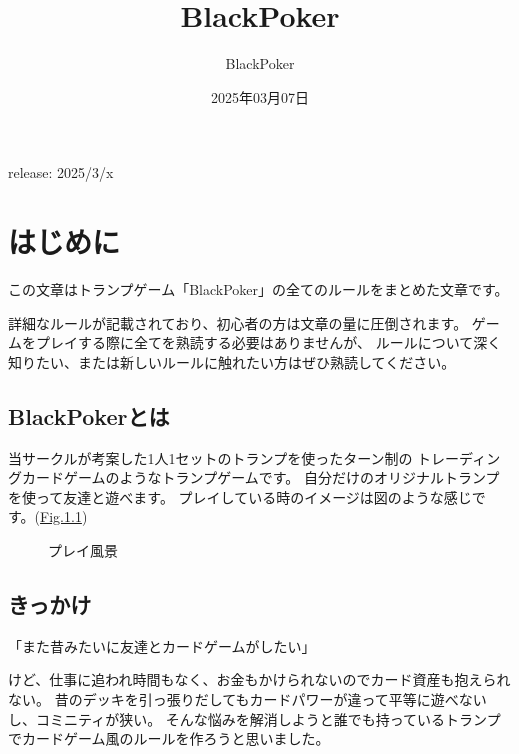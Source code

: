 \documentclass[letterpaper,10pt,dvipdfmx]{sphinxmanual}
\title{BlackPoker}
\date{2025年03月07日}
\author{BlackPoker}
\begin{document}
\pagestyle{empty}
\sphinxmaketitle
\pagestyle{plain}
\sphinxtableofcontents
\pagestyle{normal}
\label{\detokenize{index::doc}}


\sphinxAtStartPar
release: 2025/3/x

\sphinxstepscope


\chapter{はじめに}
\label{\detokenize{init/init:init-rst}}\label{\detokenize{init/init:id1}}\label{\detokenize{init/init::doc}}
\sphinxAtStartPar
この文章はトランプゲーム「BlackPoker」の全てのルールをまとめた文章です。

\sphinxAtStartPar
詳細なルールが記載されており、初心者の方は文章の量に圧倒されます。
ゲームをプレイする際に全てを熟読する必要はありませんが、
ルールについて深く知りたい、または新しいルールに触れたい方はぜひ熟読してください。


\section{BlackPokerとは}
\label{\detokenize{init/init:blackpoker}}
\sphinxAtStartPar
当サークルが考案した1人1セットのトランプを使ったターン制の
トレーディングカードゲームのようなトランプゲームです。
自分だけのオリジナルトランプを使って友達と遊べます。
プレイしている時のイメージは図のような感じです。(\hyperref[\detokenize{init/init:play-image}]{Fig.\@ \ref{\detokenize{init/init:play-image}}})

\begin{figure}[htbp]
\centering
\capstart

\noindent{}
\caption{プレイ風景}\label{\detokenize{init/init:id7}}\label{\detokenize{init/init:play-image}}\end{figure}


\section{きっかけ}
\label{\detokenize{init/init:id2}}
\begin{sphinxVerbatim}[commandchars=\\\{\}]
「また昔みたいに友達とカードゲームがしたい」
\end{sphinxVerbatim}

\sphinxAtStartPar
けど、仕事に追われ時間もなく、お金もかけられないのでカード資産も抱えられない。
昔のデッキを引っ張りだしてもカードパワーが違って平等に遊べないし、コミニティが狭い。
そんな悩みを解消しようと誰でも持っているトランプでカードゲーム風のルールを作ろうと思いました。
\end{document}
